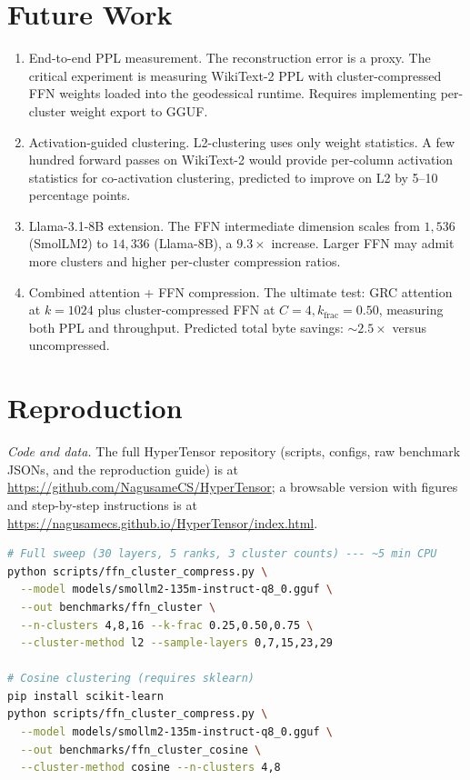 \documentclass[11pt]{article}
\begin{document}
\section{Future Work}
\label{sec:future}

\begin{enumerate}
\item End-to-end PPL measurement.  The reconstruction error
      is a proxy.  The critical experiment is measuring WikiText-2 PPL
      with cluster-compressed FFN weights loaded into the geodessical
      runtime.  Requires implementing per-cluster weight export to GGUF.

\item Activation-guided clustering.  L2-clustering uses only
      weight statistics.  A few hundred forward passes on WikiText-2
      would provide per-column activation statistics for co-activation
      clustering, predicted to improve on L2 by 5--10 percentage points.

\item Llama-3.1-8B extension.  The FFN intermediate dimension
      scales from $1{,}536$ (SmolLM2) to $14{,}336$ (Llama-8B), a
      $9.3\times$ increase.  Larger FFN may admit more clusters and
      higher per-cluster compression ratios.

\item Combined attention + FFN compression.  The ultimate test:
      GRC attention at $k{=}1024$ plus cluster-compressed FFN at
      $C{=}4,k_\text{frac}{=}0.50$, measuring both PPL and throughput.
      Predicted total byte savings: ${\sim}2.5\times$ versus uncompressed.
\end{enumerate}

\section{Reproduction}
\smallskip\noindent\textit{Code and data.} The full HyperTensor repository (scripts, configs, raw benchmark JSONs, and the reproduction guide) is at \url{https://github.com/NagusameCS/HyperTensor}; a browsable version with figures and step-by-step instructions is at \url{https://nagusamecs.github.io/HyperTensor/index.html}.

\label{sec:repro}

\begin{lstlisting}[language=bash]
# Full sweep (30 layers, 5 ranks, 3 cluster counts) --- ~5 min CPU
python scripts/ffn_cluster_compress.py \
  --model models/smollm2-135m-instruct-q8_0.gguf \
  --out benchmarks/ffn_cluster \
  --n-clusters 4,8,16 --k-frac 0.25,0.50,0.75 \
  --cluster-method l2 --sample-layers 0,7,15,23,29

# Cosine clustering (requires sklearn)
pip install scikit-learn
python scripts/ffn_cluster_compress.py \
  --model models/smollm2-135m-instruct-q8_0.gguf \
  --out benchmarks/ffn_cluster_cosine \
  --cluster-method cosine --n-clusters 4,8
\end{lstlisting}
\end{document}
